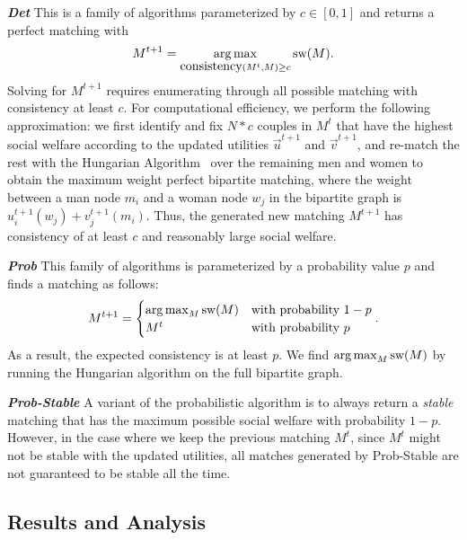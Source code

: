 \textit{\textbf{Det}} This is a family of algorithms parameterized by $c \in [0, 1]$ and returns a perfect matching with $$M^{t+1} = \operatorname*{arg\,max}_{\mbox{consistency}(M^t, M) \ge c}{\mbox{sw}(M)}.$$
Solving for $M^{t+1}$ requires enumerating through all possible matching with consistency at least $c$. For computational efficiency, we perform the following approximation: we first identify and fix $N * c$ couples in $M^t$ that have the highest social welfare according to the updated utilities $\overrightarrow{u}^{t+1}$ and $\overrightarrow{v}^{t+1}$, and re-match the rest with the Hungarian Algorithm~\cite{Kuhn55thehungarian,Kuhn56thehungarian,Munkres1957Assignment} over the remaining men and women to obtain the maximum weight perfect bipartite matching, where the weight between a man node $m_i$ and a woman node $w_j$ in the bipartite graph is $u_i^{t+1}(w_j) + v_j^{t+1}(m_i)$. Thus, the generated new matching $M^{t+1}$ has consistency of at least $c$ and reasonably large social welfare.

\textit{\textbf{Prob}} This family of algorithms is parameterized by a probability value $p$ and finds a matching as follows:
$$M^{t+1} = \begin{cases} \operatorname*{arg\,max}_M{\mbox{sw}(M)} &\text{with probability $1-p$}\\ M^t &\text{with probability $p$}\end{cases}.$$
As a result, the expected consistency is at least $p$. We find $\operatorname*{arg\,max}_M{\mbox{sw}(M)}$ by running the Hungarian algorithm on the full bipartite graph.

\textit{\textbf{Prob-Stable}} A variant of the probabilistic algorithm is to always return a \textit{stable} matching that has the maximum possible social welfare with probability $1-p$. However, in the case where we keep the previous matching $M^t$, since $M^t$ might not be stable with the updated utilities, all matches generated by Prob-Stable are not guaranteed to be stable all the time. 



\subsection{Results and Analysis}

